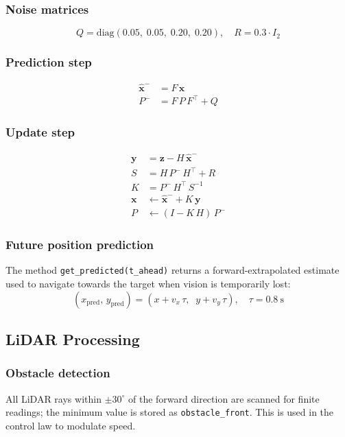\documentclass[12pt,a4paper]{article}
\begin{document}
\subsubsection*{Noise matrices}
\[
  Q = \mathrm{diag}(0.05,\; 0.05,\; 0.20,\; 0.20), \quad
  R = 0.3 \cdot I_2
\]

\subsubsection*{Prediction step}
\begin{align}
  \hat{\mathbf{x}}^{-} &= F\,\mathbf{x} \\
  P^{-} &= F\,P\,F^{\top} + Q
\end{align}

\subsubsection*{Update step}
\begin{align}
  \mathbf{y} &= \mathbf{z} - H\,\hat{\mathbf{x}}^{-} \\
  S &= H\,P^{-}\,H^{\top} + R \\
  K &= P^{-}\,H^{\top}\,S^{-1} \\
  \mathbf{x} &\leftarrow \hat{\mathbf{x}}^{-} + K\,\mathbf{y} \\
  P &\leftarrow (I - K\,H)\,P^{-}
\end{align}

\subsubsection*{Future position prediction}
The method \texttt{get\_predicted(t\_ahead)} returns a forward-extrapolated
estimate used to navigate towards the target when vision is temporarily lost:
\[
  (x_\text{pred},\, y_\text{pred}) = (x + v_x\,\tau,\;\; y + v_y\,\tau), \quad \tau = 0.8~\text{s}
\]

\subsection{LiDAR Processing}

\subsubsection*{Obstacle detection}
All LiDAR rays within $\pm30^{\circ}$ of the forward direction are scanned for
finite readings; the minimum value is stored as \texttt{obstacle\_front}.
This is used in the control law to modulate speed.
\end{document}
